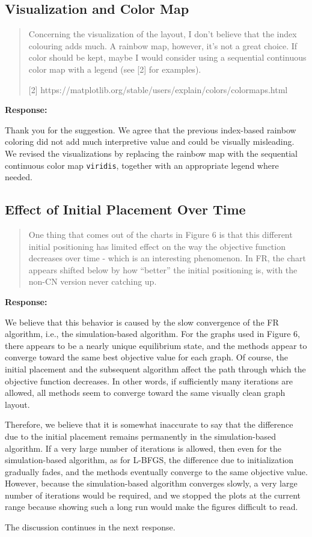 \documentclass[11pt]{article}
\newcommand{\reviewercomment}[1]{%
  \begin{quote}
  \color{blue}
  #1
  \end{quote}
}
\newenvironment{response}{%
  \noindent\textbf{Response:}%
}{%
  \medskip
}
\begin{document}
\subsection{Visualization and Color Map}

\reviewercomment{
  Concerning the visualization of the layout, I don't believe that the index colouring adds much.
  A rainbow map, however, it's not a great choice.
  If color should be kept, maybe I would consider using a sequential continuous color map with a legend (see [2] for examples).

    [2] https://matplotlib.org/stable/users/explain/colors/colormaps.html
}

\begin{response}
  Thank you for the suggestion.
  We agree that the previous index-based rainbow coloring did not add much interpretive value and could be visually misleading.
  We revised the visualizations by replacing the rainbow map with the sequential continuous color map \texttt{viridis}, together with an appropriate legend where needed.
\end{response}

\subsection{Effect of Initial Placement Over Time}

\reviewercomment{
  One thing that comes out of the charts in Figure 6 is that this different initial positioning has limited effect on the way the objective function decreases over time - which is an interesting phenomenon.
  In FR, the chart appears shifted below by how ``better'' the initial positioning is, with the non-CN version never catching up.
}

\begin{response}
  We believe that this behavior is caused by the slow convergence of the FR algorithm, i.e., the simulation-based algorithm. For the graphs used in Figure 6, there appears to be a nearly unique equilibrium state, and the methods appear to converge toward the same best objective value for each graph. Of course, the initial placement and the subsequent algorithm affect the path through which the objective function decreases. In other words, if sufficiently many iterations are allowed, all methods seem to converge toward the same visually clean graph layout.

  Therefore, we believe that it is somewhat inaccurate to say that the difference due to the initial placement remains permanently in the simulation-based algorithm. If a very large number of iterations is allowed, then even for the simulation-based algorithm, as for L-BFGS, the difference due to initialization gradually fades, and the methods eventually converge to the same objective value. However, because the simulation-based algorithm converges slowly, a very large number of iterations would be required, and we stopped the plots at the current range because showing such a long run would make the figures difficult to read.

  The discussion continues in the next response.
\end{response}
\end{document}

